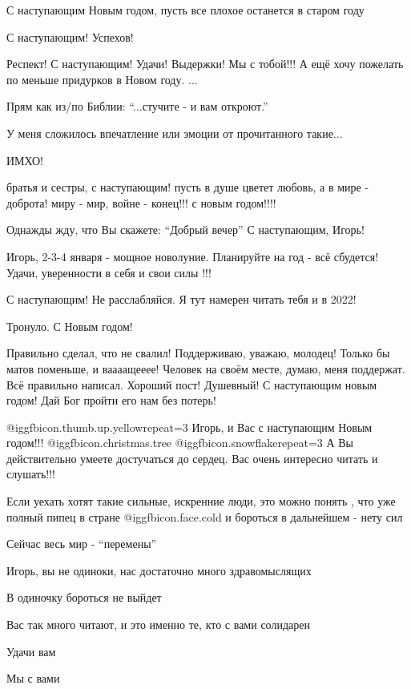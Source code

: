 \begin{itemize}
С наступающим Новым годом, пусть все плохое останется в старом году


С наступающим! Успехов!


Респект! С наступающим! Удачи! Выдержки! Мы с тобой!!! А ещё хочу пожелать по
меньше придурков  в Новом году. ...


Прям как из/по Библии: \enquote{...стучите - и вам откроют.}

У меня сложилось впечатление или эмоции от прочитанного такие...

ИМХО!


братья и сестры, с наступающим! пусть в душе цветет любовь, а в мире - доброта!
миру - мир, войне - конец!!! с новым годом!!!!


Однажды жду, что Вы скажете: \enquote{Добрый вечер} С наступающим, Игорь!


Игорь, 2-3-4 января - мощное новолуние. Планируйте на год - всё сбудется!
Удачи, уверенности в себя и свои силы !!!


С наступающим! Не расслабляйся. Я тут намерен читать тебя и в 2022!


Тронуло. С Новым годом!


Правильно сделал, что не свалил! Поддерживаю, уважаю, молодец! Только бы матов
поменьше, и ваааащееее! Человек на своём месте, думаю, меня поддержат. Всё
правильно написал. Хороший пост! Душевный! С наступающим новым годом! Дай Бог
пройти его нам без потерь!


@igg{fbicon.thumb.up.yellow}{repeat=3}  Игорь, и Вас с наступающим Новым
годом!!! @igg{fbicon.christmas.tree} @igg{fbicon.snowflake}{repeat=3} А Вы
действительно умеете достучаться до сердец. Вас очень интересно читать и
слушать!!!


Если уехать хотят такие сильные, искренние люди, это можно понять , что уже
полный пипец в стране @igg{fbicon.face.cold}   и бороться в дальнейшем -  нету сил 

Сейчас весь мир  - \enquote{перемены}

Игорь, вы не одиноки, нас достаточно много здравомыслящих

В одиночку бороться не выйдет

Вас так много читают, и это именно те, кто с вами солидарен

Удачи вам 

Мы с вами

\end{itemize} %
